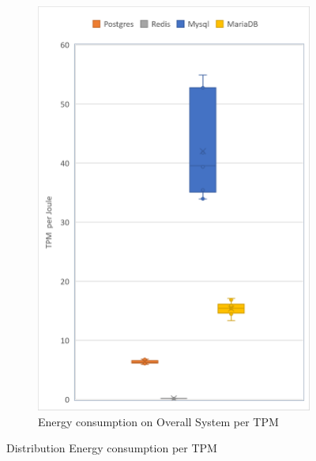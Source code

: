\begin{figure}[!ht]
\begin{subfigure}[b]{0.30\textwidth}
            \includegraphics[width=1\columnwidth]{results/boxplot/total-tpm.png}
            \caption[]%
            {{\small Energy consumption on Overall System per TPM}}    
            \label{fig:bocplottranstotal}
        \end{subfigure}
        \caption[ Distribution of Energy consumption per TPM  ]
        {\small Distribution Energy consumption per TPM } 
        \label{fig:bocplottrans}
    \end{figure}
   